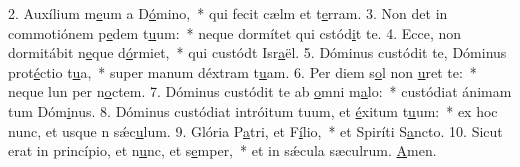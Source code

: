 2. Auxílium m\uline{e}um a D\uline{ó}mino,~* qui fecit cælm et t\uline{e}rram.
3. Non det in commotiónem p\uline{e}dem t\uline{u}um:~* neque dormítet qui cstód\uline{i}t te.
4. Ecce, non dormitábit n\uline{e}que d\uline{ó}rmiet,~* qui custódt Isr\uline{a}ël.
5. Dóminus custódit te, Dóminus prot\uline{é}ctio t\uline{u}a,~* super manum déxtram t\uline{u}am.
6. Per diem s\uline{o}l non \uline{u}ret te:~* neque lun per n\uline{o}ctem.
7. Dóminus custódit te ab \uline{o}mni m\uline{a}lo:~* custódiat ánimam tum Dóm\uline{i}nus.
8. Dóminus custódiat intróitum tuum, et \uline{é}xitum t\uline{u}um:~* ex hoc nunc, et usque n sǽc\uline{u}lum.
9. Glória P\uline{a}tri, et F\uline{í}lio,~* et Spiríti S\uline{a}ncto.
10. Sicut erat in princípio, et n\uline{u}nc, et s\uline{e}mper,~* et in sǽcula sæculrum. \uline{A}men.
